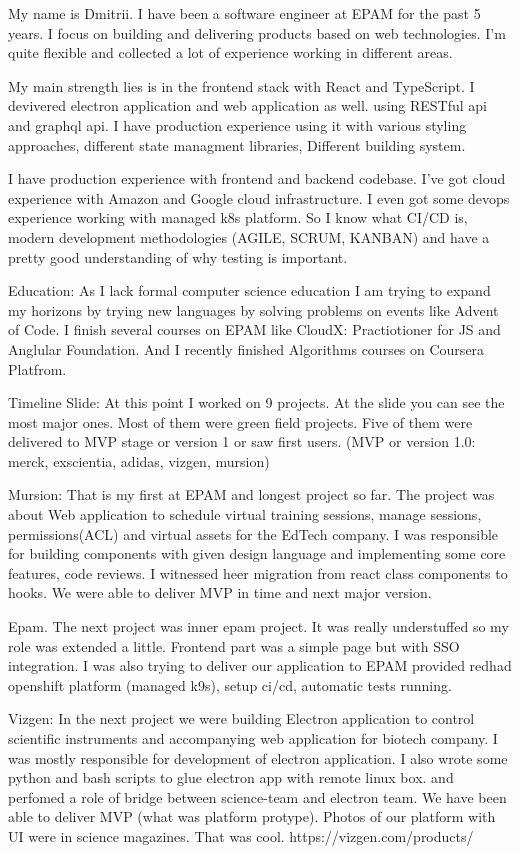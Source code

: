\documentclass[11pt, a4paper, sans]{article}
\begin{document}
My name is Dmitrii. I have been a software engineer at EPAM for the past 5 years. I focus on building and delivering products based on web technologies. I'm quite flexible and collected a lot of experience working in different areas. 

My main strength lies is in the frontend stack with React and TypeScript. I devivered electron application and web application as well. using RESTful api and graphql api. I have production experience using it with various styling approaches, different state managment libraries, Different building system.

I have production experience with frontend and backend codebase. I've got cloud experience with Amazon and Google cloud infrastructure. I even got some devops experience working with managed k8s platform. So I know what CI/CD is, modern development methodologies (AGILE, SCRUM, KANBAN) and have a pretty good understanding of why testing is important. 

Education: As I lack formal computer science education I am trying to expand my horizons by trying new languages by solving problems on events like Advent of Code. I finish several courses on EPAM  like CloudX: Practiotioner for JS and Anglular Foundation. And I recently finished Algorithms courses on Coursera Platfrom.

Timeline Slide:
At this point I worked on 9 projects. At the slide you can see the most major ones. Most of them were green field projects. Five of them were delivered to MVP stage or version 1 or saw first users.
(MVP or version 1.0: merck, exscientia, adidas, vizgen, mursion)

Mursion: That is my first at EPAM and longest project so far. The project was about Web application to schedule virtual training sessions, manage sessions, permissions(ACL) and virtual assets for the EdTech company. I was responsible for building components with given design language and implementing some core features, code reviews. I witnessed heer migration from react class components to hooks. We were able to deliver MVP in time and next major version.

Epam. The next project was inner epam project. It was really understuffed so my role was extended a little. Frontend part was a simple page but with SSO integration. I was also trying to deliver our application to EPAM provided redhad openshift platform (managed k9s), setup ci/cd, automatic tests running. 

Vizgen: In the next project we were building Electron application to control scientific instruments and accompanying web application for biotech company. I was mostly responsible for development of electron application. I also wrote some python and bash scripts to glue electron app with remote linux box. and perfomed a role of bridge between science-team and electron team. We have been able to deliver MVP (what was platform protype). Photos of our platform with UI were in science magazines. That was cool. 
https://vizgen.com/products/
\end{document}
